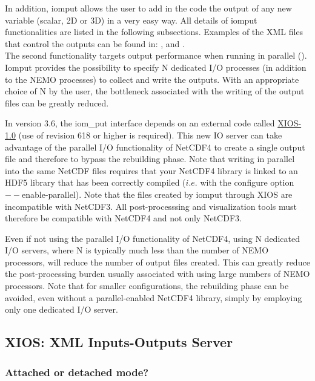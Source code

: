 \documentclass[../tex_main/NEMO_manual]{subfiles}
\begin{document}
In addition, iomput allows the user to add in the code the output of any new variable (scalar, 2D or 3D)
in a very easy way.
All details of iomput functionalities are listed in the following subsections.
Examples of the XML files that control the outputs can be found in: ,
 and . \\

The second functionality targets output performance when running in parallel ().
Iomput provides the possibility to specify N dedicated I/O processes (in addition to the NEMO processes)
to collect and write the outputs.
With an appropriate choice of N by the user, the bottleneck associated with the writing of
the output files can be greatly reduced.

In version 3.6, the iom\_put interface depends on
an external code called \href{https://forge.ipsl.jussieu.fr/ioserver/browser/XIOS/branchs/xios-1.0}{XIOS-1.0} 
(use of revision 618 or higher is required).
This new IO server can take advantage of the parallel I/O functionality of NetCDF4 to
create a single output file and therefore to bypass the rebuilding phase.
Note that writing in parallel into the same NetCDF files requires that your NetCDF4 library is linked to
an HDF5 library that has been correctly compiled ($i.e.$ with the configure option $--$enable-parallel).
Note that the files created by iomput through XIOS are incompatible with NetCDF3.
All post-processsing and visualization tools must therefore be compatible with NetCDF4 and not only NetCDF3.

Even if not using the parallel I/O functionality of NetCDF4, using N dedicated I/O servers,
where N is typically much less than the number of NEMO processors, will reduce the number of output files created.
This can greatly reduce the post-processing burden usually associated with using large numbers of NEMO processors.
Note that for smaller configurations, the rebuilding phase can be avoided,
even without a parallel-enabled NetCDF4 library, simply by employing only one dedicated I/O server.

\subsection{XIOS: XML Inputs-Outputs Server}

\subsubsection{Attached or detached mode?}
\end{document}
